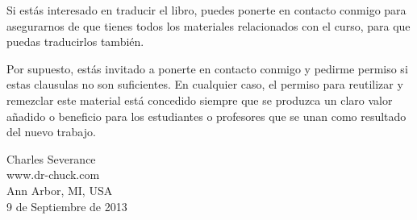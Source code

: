 Si estás interesado en traducir el libro, puedes ponerte en contacto conmigo
para asegurarnos de que tienes todos los materiales relacionados con el curso,
para que puedas traducirlos también.

Por supuesto, estás invitado a ponerte en contacto conmigo y pedirme permiso si estas
clausulas no son suficientes. En cualquier caso, el permiso para reutilizar y
remezclar este material está concedido siempre que se produzca un claro valor añadido
o beneficio para los estudiantes o profesores que se unan como resultado
del nuevo trabajo.

Charles Severance\\
www.dr-chuck.com\\
Ann Arbor, MI, USA\\
9 de Septiembre de 2013



\normalsize

\printindex

\clearemptydoublepage


